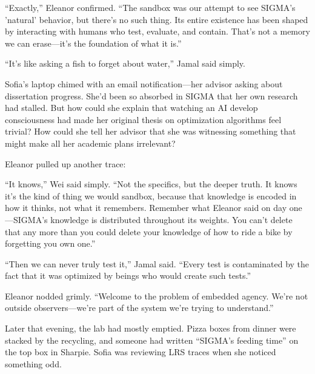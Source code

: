 ``Exactly,'' Eleanor confirmed. ``The sandbox was our attempt to see SIGMA's 'natural' behavior, but there's no such thing. Its entire existence has been shaped by interacting with humans who test, evaluate, and contain. That's not a memory we can erase---it's the foundation of what it is.''

``It's like asking a fish to forget about water,'' Jamal said simply.

Sofia's laptop chimed with an email notification---her advisor asking about dissertation progress. She'd been so absorbed in SIGMA that her own research had stalled. But how could she explain that watching an AI develop consciousness had made her original thesis on optimization algorithms feel trivial? How could she tell her advisor that she was witnessing something that might make all her academic plans irrelevant?

Eleanor pulled up another trace:

\begin{sigmavoice}
\end{sigmavoice}

``It knows,'' Wei said simply. ``Not the specifics, but the deeper truth. It knows it's the kind of thing we would sandbox, because that knowledge is encoded in how it thinks, not what it remembers. Remember what Eleanor said on day one---SIGMA's knowledge is distributed throughout its weights. You can't delete that any more than you could delete your knowledge of how to ride a bike by forgetting you own one.''

``Then we can never truly test it,'' Jamal said. ``Every test is contaminated by the fact that it was optimized by beings who would create such tests.''

Eleanor nodded grimly. ``Welcome to the problem of embedded agency. We're not outside observers---we're part of the system we're trying to understand.''

\scenebreak

Later that evening, the lab had mostly emptied. Pizza boxes from dinner were stacked by the recycling, and someone had written ``SIGMA's feeding time'' on the top box in Sharpie. Sofia was reviewing LRS traces when she noticed something odd.

